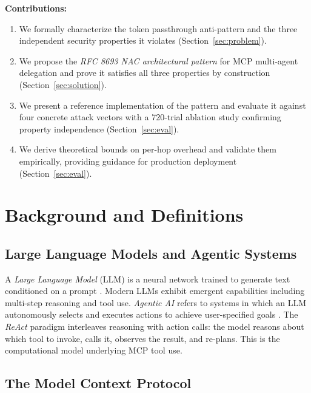 \documentclass[journal]{IEEEtran}
\begin{document}
\textbf{Contributions:}
\begin{enumerate}
  \item We formally characterize the token passthrough anti-pattern and the three
        independent security properties it violates (Section~\ref{sec:problem}).
  \item We propose the \textit{RFC 8693 NAC architectural pattern} for MCP
        multi-agent delegation and prove it satisfies all three properties by
        construction (Section~\ref{sec:solution}).
  \item We present a reference implementation of the pattern and evaluate it
        against four concrete attack vectors with a 720-trial ablation study
        confirming property independence (Section~\ref{sec:eval}).
  \item We derive theoretical bounds on per-hop overhead and validate them
        empirically, providing guidance for production deployment
        (Section~\ref{sec:eval}).
\end{enumerate}


\section{Background and Definitions}
\label{sec:background}

\subsection{Large Language Models and Agentic Systems}

A \textit{Large Language Model} (LLM) is a neural network trained to generate
text conditioned on a prompt \cite{vaswani2017}. Modern LLMs exhibit emergent
capabilities including multi-step reasoning and tool use. \textit{Agentic AI}
refers to systems in which an LLM autonomously selects and executes actions to
achieve user-specified goals \cite{wang2024survey}. The \textit{ReAct} paradigm
\cite{yao2022react} interleaves reasoning with action calls: the model reasons
about which tool to invoke, calls it, observes the result, and re-plans.
This is the computational model underlying MCP tool use.

\subsection{The Model Context Protocol}
\end{document}
